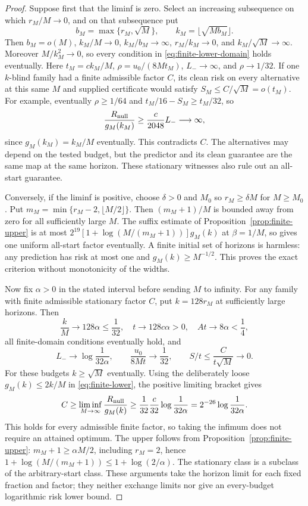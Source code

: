 \begin{proof}
Suppose first that the liminf is zero. Select an increasing subsequence
on which $r_M/M\to0$, and on that subsequence put
\[
 b_M=\max\{r_M,\sqrt M\},\qquad
 k_M=\lfloor\sqrt{Mb_M}\rfloor.
\]
Then $b_M=o(M)$, $k_M/M\to0$, $k_M/b_M\to\infty$,
$r_M/k_M\to0$, and $k_M/\sqrt M\to\infty$. Moreover
$M/k_M^2\to0$, so every condition in
\eqref{eq:finite-lower-domain} holds eventually. Here
$t_M=ck_M/M$, $\rho=u_0/(8Mt_M)$, $L_-\to\infty$, and
$\rho\to1/32$.
If one $k$-blind family had a finite admissible factor $C$, its clean
risk on every alternative at this same $M$ and supplied certificate
would satisfy $S_M\le C/\sqrt M=o(t_M)$. For example, eventually
$\rho\ge1/64$ and $t_M/16-S_M\ge t_M/32$, so
\[
 \frac{R_{\rm null}}{g_M(k_M)}
 \ge\frac{c}{2048}L_-\longrightarrow\infty,
\]
since $g_M(k_M)=k_M/M$ eventually. This contradicts $C$.
The alternatives may depend on the tested budget, but the predictor
and its clean guarantee are the same map at the same horizon. These
stationary witnesses also rule out an all-start guarantee.

Conversely, if the liminf is positive, choose $\delta>0$ and $M_0$
so $r_M\ge\delta M$ for $M\ge M_0$. Put
$m_M=\min\{r_M-2,\lfloor M/2\rfloor\}$.
Then $(m_M+1)/M$ is bounded away from zero for all sufficiently large
$M$. The suffix estimate of Proposition~\ref{prop:finite-upper} is at
most $2^{19}[1+\log(M/(m_M+1))]g_M(k)$ at $\beta=1/M$, so gives
one uniform all-start factor eventually. A finite initial set of
horizons is harmless: any prediction has risk at most one and
$g_M(k)\ge M^{-1/2}$. This proves the exact criterion without
monotonicity of the widths.

Now fix $\alpha>0$ in the stated interval before sending $M$ to
infinity. For any family with finite admissible stationary factor $C$,
put $k=128r_M$ at sufficiently large horizons. Then
\[
 \frac kM\to128\alpha\le\frac1{32},\quad
 t\to128c\alpha>0,\quad At\to8\alpha<\frac14,
\]
all finite-domain conditions eventually hold, and
\[
 L_-\to\log\frac1{32\alpha},\qquad
 \frac{u_0}{8Mt}\to\frac1{32},\qquad
 S/t\le\frac{C}{t\sqrt M}\to0.
\]
For these budgets $k\ge\sqrt M$ eventually. Using the deliberately
loose $g_M(k)\le2k/M$ in \eqref{eq:finite-lower}, the positive limiting
bracket gives
\[
 C\ge\liminf_{M\to\infty}\frac{R_{\rm null}}{g_M(k)}
 \ge\frac1{32}\frac{c}{32}\log\frac1{32\alpha}
 =2^{-26}\log\frac1{32\alpha}.
\]
This holds for every admissible finite factor, so taking the infimum
does not require an attained optimum. The upper follows from
Proposition~\ref{prop:finite-upper}: $m_M+1\ge\alpha M/2$, including
$r_M=2$, hence $1+\log(M/(m_M+1))\le1+\log(2/\alpha)$.
The stationary class is a subclass of the arbitrary-start class.
These arguments take the horizon limit for each fixed fraction and
factor; they neither exchange limits nor give an every-budget
logarithmic risk lower bound.


\end{proof}
